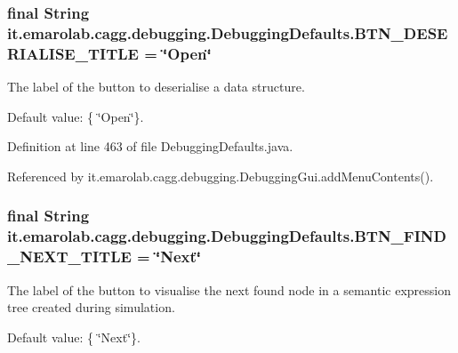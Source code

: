 \hypertarget{classit_1_1emarolab_1_1cagg_1_1debugging_1_1DebuggingDefaults_aaa30a421f25d00b3bff77c6fdb247514}{
\subsubsection[{B\-T\-N\-\_\-\-D\-E\-S\-E\-R\-I\-A\-L\-I\-S\-E\-\_\-\-T\-I\-T\-L\-E}]{\setlength{\rightskip}{0pt plus 5cm}final String it.\-emarolab.\-cagg.\-debugging.\-Debugging\-Defaults.\-B\-T\-N\-\_\-\-D\-E\-S\-E\-R\-I\-A\-L\-I\-S\-E\-\_\-\-T\-I\-T\-L\-E = \char`\"{}Open\char`\"{}\hspace{0.3cm}{\ttfamily [static]}}}\label{classit_1_1emarolab_1_1cagg_1_1debugging_1_1DebuggingDefaults_aaa30a421f25d00b3bff77c6fdb247514}
The label of the button to deserialise a data structure. \par
 Default value\-: \{ \char`\"{}\-Open\char`\"{}\}. 

Definition at line 463 of file Debugging\-Defaults.\-java.



Referenced by it.\-emarolab.\-cagg.\-debugging.\-Debugging\-Gui.\-add\-Menu\-Contents().

\hypertarget{classit_1_1emarolab_1_1cagg_1_1debugging_1_1DebuggingDefaults_a1be1d1909f6b28ae4126b3ff5feda061}{
\subsubsection[{B\-T\-N\-\_\-\-F\-I\-N\-D\-\_\-\-N\-E\-X\-T\-\_\-\-T\-I\-T\-L\-E}]{\setlength{\rightskip}{0pt plus 5cm}final String it.\-emarolab.\-cagg.\-debugging.\-Debugging\-Defaults.\-B\-T\-N\-\_\-\-F\-I\-N\-D\-\_\-\-N\-E\-X\-T\-\_\-\-T\-I\-T\-L\-E = \char`\"{}Next\char`\"{}\hspace{0.3cm}{\ttfamily [static]}}}\label{classit_1_1emarolab_1_1cagg_1_1debugging_1_1DebuggingDefaults_a1be1d1909f6b28ae4126b3ff5feda061}
The label of the button to visualise the next found node in a semantic expression tree created during simulation. \par
 Default value\-: \{ \char`\"{}\-Next\char`\"{}\}. 

